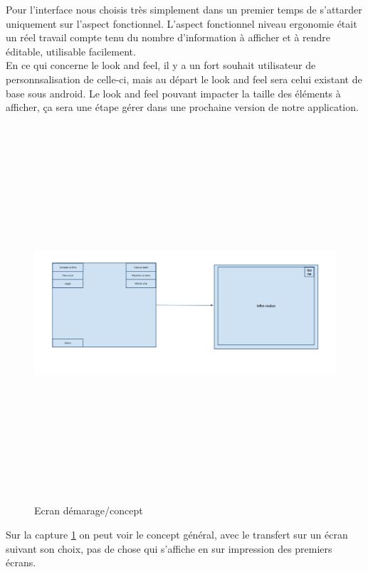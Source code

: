 \documentclass[11pt,a4paper]{article}
\begin{document}
Pour l'interface nous choisis très simplement dans un premier temps de 
s'attarder uniquement sur l'aspect fonctionnel. L'aspect fonctionnel niveau ergonomie 
était un réel travail compte tenu du nombre d'information à afficher et à rendre éditable, utilisable facilement.\\

En ce qui concerne le look and feel, il y a un fort souhait utilisateur de personnsalisation de celle-ci, 
mais au départ le look and feel sera celui existant de base sous android. Le look and feel pouvant impacter
la taille des éléments à afficher, ça sera une étape gérer dans une prochaine version de notre application.\\

\begin{figure}[h]
  	
  		\includegraphics[height=14cm,width=15cm]{image/screen1.png}
  		\caption{Ecran démarage/concept}
  		\label{screen1}
\end{figure}

Sur la capture \ref{screen1} on peut voir le concept général, avec le transfert sur un écran suivant
son choix, pas de chose qui s'affiche en sur impression des premiers écrans.
\end{document}
